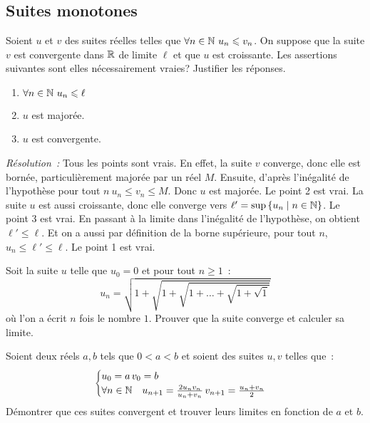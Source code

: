             \subsection{Suites monotones}
            \begin{exercice}
              Soient \(u\) et \(v\) des suites réelles telles que \(\forall n 
              \in \mathbb{N} \ u_n \leqslant v_n\). On suppose que la suite \(v\) est 
              convergente dans \(\mathbb{R}\) de limite \(\ell\) et que \(u\) est 
              croissante. Les assertions suivantes sont elles nécessairement 
              vraies? Justifier les réponses.
              \begin{enumerate}
                \item \(\forall n \in \mathbb{N} \ u_n \leqslant \ell\)
                \item \(u\) est majorée.
                \item \(u\) est convergente.
              \end{enumerate}    \end{exercice}
              \emph{Résolution~:} Tous les points sont vrais. En effet, la suite 
              \(v\) converge, donc elle est bornée, particulièrement majorée par 
              un réel \(M\). Ensuite, d'après l'inégalité de l'hypothèse pour 
              tout \(n \ u_n \leqslant v_n \leqslant M\). Donc \(u\) est 
              majorée. Le point 2 est vrai. La suite \(u\) est aussi croissante, 
              donc elle converge vers \(\ell' = \sup\left\{u_n\mathrel{}\middle|\mathrel{}n\in \mathbb{N}\right\}\). Le 
              point 3 est vrai. En passant à la limite dans l'inégalité de 
              l'hypothèse, on obtient \(\ell' \leqslant \ell\). Et on a aussi 
              par définition de la borne supérieure, pour tout \(n\), \(u_n 
              \leqslant \ell' \leqslant \ell\). Le point 1 est vrai.
              \begin{exercice}
                Soit la suite \(u\) telle que \(u_0 = 0\) et pour tout \(n 
                \geqslant 1\)~:
                \[ u_n = \sqrt{1 + \sqrt{ 1 + \sqrt{ 1 + \ldots +\sqrt{1 + 
                \sqrt{1}}}}} \]
                où l'on a écrit \(n\) fois le nombre \(1\). Prouver que la suite 
                converge et calculer sa limite.
              \end{exercice}
              \begin{exercice}
                Soient deux réels \(a, b\) tels que \(0 < a < b\) et soient des 
                suites \(u, v\) telles que~:
                \[ \begin{cases} u_0 = a \, v_0 = b \\ \forall n \in \mathbb{N} \quad 
                u_{n+1} = \frac{2 u_n v_n}{u_n + v_n} \, v_{n+1} = 
              \frac{u_n+v_n}{2} \end{cases}\]
              Démontrer que ces suites convergent et trouver leurs limites en 
              fonction de \(a\) et \(b\).
            \end{exercice}
